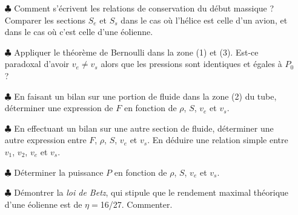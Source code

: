 \documentclass{report}
\begin{document}
\begin{itemize}
	\item[$\clubsuit$] Comment s'écrivent les relations de conservation du début massique ? Comparer les sections $S_e$ et $S_s$ dans le cas où l'hélice est celle d'un avion, et dans le cas où c'est celle d'une éolienne. 
	\item[$\clubsuit$] Appliquer le théorème de Bernoulli dans la zone (1) et (3). Est-ce paradoxal d'avoir $v_e\neq v_s$ alors que les pressions sont identiques et égales à $P_0$ ?
	\item[$\clubsuit$] En faisant un bilan sur une portion de fluide dans la zone (2) du tube, déterminer une expression de $F$ en fonction de $\rho$, $S$, $v_e$ et $v_s$.
	\item[$\clubsuit$] En effectuant un bilan sur une autre section de fluide, déterminer une autre expression entre $F$, $\rho$, $S$, $v_e$ et $v_s$. En déduire une relation simple entre $v_1$, $v_2$, $v_e$ et $v_s$.
	\item[$\clubsuit$] Déterminer la puissance $P$ en fonction de $\rho$, $S$, $v_e$ et $v_s$. 
	
	\item[$\clubsuit$] Démontrer la \textit{loi de Betz}, qui stipule que le rendement maximal théorique d'une éolienne est de $\eta=$16/27. Commenter.
	
\end{itemize}
\end{document}
